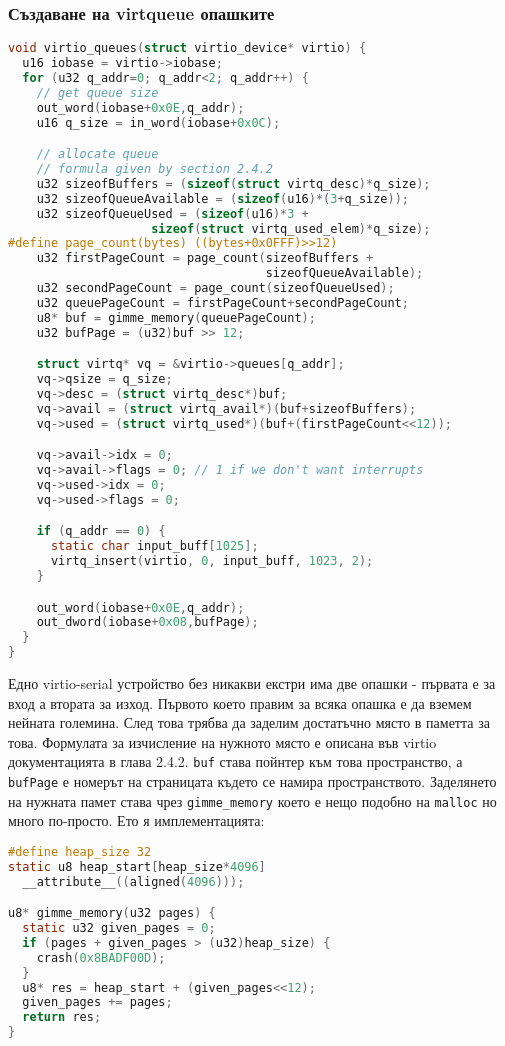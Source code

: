 \subsubsection{Създаване на virtqueue опашките}
\begin{lstlisting}[language=C]
void virtio_queues(struct virtio_device* virtio) {
  u16 iobase = virtio->iobase;
  for (u32 q_addr=0; q_addr<2; q_addr++) {
    // get queue size
    out_word(iobase+0x0E,q_addr);
    u16 q_size = in_word(iobase+0x0C);

    // allocate queue
    // formula given by section 2.4.2
    u32 sizeofBuffers = (sizeof(struct virtq_desc)*q_size);
    u32 sizeofQueueAvailable = (sizeof(u16)*(3+q_size));
    u32 sizeofQueueUsed = (sizeof(u16)*3 +
                    sizeof(struct virtq_used_elem)*q_size);
#define page_count(bytes) ((bytes+0x0FFF)>>12)
    u32 firstPageCount = page_count(sizeofBuffers +
                                    sizeofQueueAvailable);
    u32 secondPageCount = page_count(sizeofQueueUsed);
    u32 queuePageCount = firstPageCount+secondPageCount;
    u8* buf = gimme_memory(queuePageCount);
    u32 bufPage = (u32)buf >> 12;

    struct virtq* vq = &virtio->queues[q_addr];
    vq->qsize = q_size;
    vq->desc = (struct virtq_desc*)buf;
    vq->avail = (struct virtq_avail*)(buf+sizeofBuffers);
    vq->used = (struct virtq_used*)(buf+(firstPageCount<<12));

    vq->avail->idx = 0;
    vq->avail->flags = 0; // 1 if we don't want interrupts
    vq->used->idx = 0;
    vq->used->flags = 0;

    if (q_addr == 0) {
      static char input_buff[1025];
      virtq_insert(virtio, 0, input_buff, 1023, 2);
    }

    out_word(iobase+0x0E,q_addr);
    out_dword(iobase+0x08,bufPage);
  }
}
\end{lstlisting}
Едно virtio-serial устройство без никакви екстри има две опашки - първата е за вход а втората за изход. Първото което правим за всяка опашка е да вземем нейната големина. След това трябва да заделим достатъчно място в паметта за това. Формулата за изчисление на нужното място е описана във virtio документацията в глава 2.4.2. {\tt buf} става пойнтер към това пространство, а {\tt bufPage} е номерът на страницата където се намира пространството. Заделянето на нужната памет става чрез {\tt gimme\_memory} което е нещо подобно на {\tt malloc} но много по-просто. Ето я имплементацията:
\begin{lstlisting}[language=C]
#define heap_size 32
static u8 heap_start[heap_size*4096]
  __attribute__((aligned(4096)));

u8* gimme_memory(u32 pages) {
  static u32 given_pages = 0;
  if (pages + given_pages > (u32)heap_size) {
    crash(0x8BADF00D);
  }
  u8* res = heap_start + (given_pages<<12);
  given_pages += pages;
  return res;
}
\end{lstlisting}


